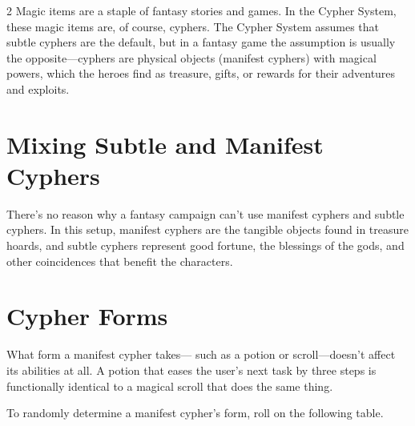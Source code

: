 \begin{multicols}{2}
Magic items are a staple of fantasy stories and games. In the Cypher System, these magic items are, of course, cyphers. The Cypher System assumes that subtle cyphers are the default, but in a fantasy game the assumption is usually the opposite—cyphers are physical objects (manifest cyphers) with magical powers, which the heroes find as treasure, gifts, or rewards for their adventures and exploits. 

\section{Mixing Subtle and Manifest Cyphers}

There’s no reason why a fantasy campaign can’t use manifest cyphers and subtle cyphers. In this setup, manifest cyphers are the tangible objects found in treasure hoards, and subtle cyphers represent good fortune, the blessings of the gods, and other coincidences that benefit the characters. 

\section{Cypher Forms}

What form a manifest cypher takes— such as a potion or scroll—doesn’t affect its abilities at all. A potion that eases the user’s next task by three steps is functionally identical to a magical scroll that does the same thing.

To randomly determine a manifest cypher’s form, roll on the following table.

\end{multicols}

